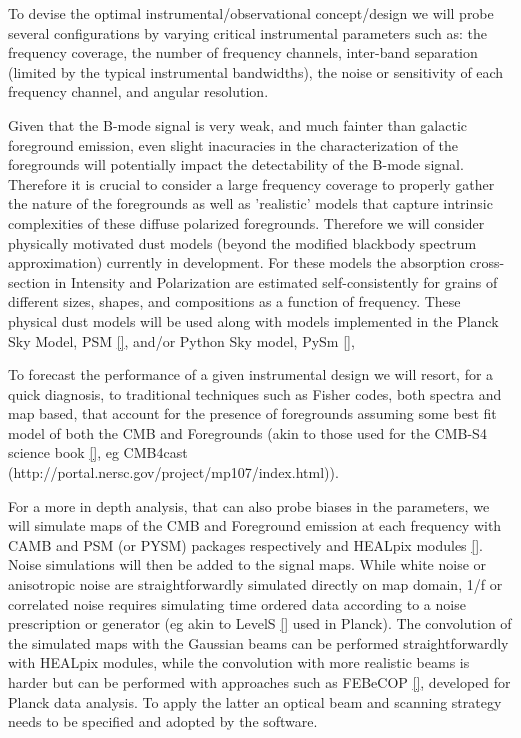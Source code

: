 To devise the optimal instrumental/observational concept/design we will probe several configurations by varying critical instrumental parameters such as: the frequency coverage, the number of frequency channels, inter-band separation (limited by the typical instrumental bandwidths), the noise or sensitivity of each frequency channel, and angular resolution. 

Given that the B-mode signal is very weak, and much fainter than galactic foreground emission, even slight inacuracies in the characterization of the foregrounds will potentially impact the detectability of the B-mode signal. Therefore it is crucial to consider a large frequency coverage to properly gather the nature of the foregrounds as well as 'realistic' models that capture intrinsic complexities of these diffuse polarized foregrounds.
Therefore we will consider physically motivated dust models (beyond the modified blackbody spectrum approximation) currently in development. 
For these models the absorption cross-section in Intensity and Polarization are estimated self-consistently for grains of different sizes, shapes, and compositions as a function of frequency. These physical dust models will be used along with models implemented in the Planck Sky Model, PSM \ref{}, and/or  Python Sky model, PySm \ref{}, 


To forecast the performance of a given instrumental design we will resort, for a quick diagnosis, to traditional techniques such as Fisher codes, both spectra and map based, that account for the presence of foregrounds assuming some best fit model of both the CMB and Foregrounds (akin to those used for the CMB-S4 science book \ref{}, eg CMB4cast (http://portal.nersc.gov/project/mp107/index.html)). 

For a more in depth analysis, that can also probe biases in the parameters, we will simulate maps of the CMB and Foreground emission at each frequency with CAMB and PSM (or PYSM) packages respectively and HEALpix modules \ref{}. Noise simulations will then be added to the signal maps.
While white noise or anisotropic noise are straightforwardly simulated directly on map domain, 1/f or correlated noise requires simulating time ordered data according to a noise prescription or generator (eg akin to LevelS \ref{} used in Planck). The convolution of the simulated maps with the Gaussian beams can be performed straightforwardly with HEALpix modules, while the convolution with more realistic beams is harder but can be performed with approaches such as FEBeCOP \ref{}, developed for Planck data analysis. To apply the latter an optical beam and scanning strategy needs to be specified and adopted by the software.

